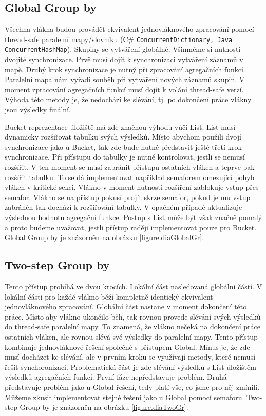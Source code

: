 \subsection{Global Group by} \label{anal.groupby.global}

Všechna vlákna budou provádět ekvivalent jednovláknového zpracování pomocí thread-safe paralelní mapy/slovníku (C\# \texttt{ConcurrentDictionary, Java \texttt{ConcurrentHashMap}}).
Skupiny se vytváření globálně.
Všimněme si nutnosti dvojité synchronizace.
Prvě musí dojít k synchronizaci vytváření záznamů v mapě.
Druhý krok synchronizace je nutný při zpracování agregačních funkcí.
Paralelní mapa nám vyřadí souběh při vytváření nových záznamů skupin.
V moment zpracování agregačních funkcí musí dojít k volání thread-safe verzí.
Výhoda této metody je, že nedochází ke slévání, tj. po dokončení práce vlákny jsou výsledky finální.

Bucket reprezentace úložiště má zde značnou výhodu vůči List.
List musí dynamicky rozšiřovat tabulku svých výsledků.
Místo abychom použili dvojí synchronizace jako u Bucket, tak zde bude nutné představit ještě třetí krok synchronizace.
Při přístupu do tabulky je nutné kontrolovat, jestli se nemusí rozšířit.
V ten moment se musí zabránit přístupu ostatních vláken a teprve pak rozšířit tabulku.
To se dá implementovat například semaforem omezující pohyb vláken v kritické sekci.
Vlákno v moment nutnosti rozšíření zablokuje vstup přes semafor.
Vlákno se na přístup pokusí projít skrze semafor, pokud je mu vstup zabráněn tak dochází k rozšiřování tabulky.
V opačném případě aktualizuje výslednou hodnotu agregační funkce.
Postup s List může být však značně pomalý a proto budeme uvažovat, jestli přístup raději implementovat pouze pro Bucket.
Global Group by je znázorněn na obrázku \ref{figure.diaGlobalGr}.

\subsection{Two-step Group by} \label{anal.groupby.twostep}

Tento přístup probíhá ve dvou krocích.
Lokální část nasledovaná globální částí. 
V lokální části pro každé vlákno běží kompletně identický ekvivalent jednovláknového zpracování.
Globální část nastane v moment dokončení této práce.
Místo aby vlákno ukončilo běh, tak rovnou provede slévání svých výsledků do thread-safe paralelní mapy.
To znamená, že vlákno nečeká na dokončení práce ostatních vláken, ale rovnou slévá své výsledky do paralelní mapy.
Tento přístup kombinuje jednovláknové řešení společně s přístupem Global.
Mínus je, že zde musí docházet ke slévání, ale v prvním kroku se využívají metody, které nemusí řešit synchoronizaci. 
Problematická část je zde slévání výsledků s List úložištěm výsledků agregačních funkcí.
První fáze nepředstavuje problém. 
Druhá představuje problém jako u Global řešení, tedy platí vše, co jsme pro něj zmínili.
Můžeme zkusit implementovat stejné řešení jako u Global pomocí semaforu.
Two-step Group by je znázorněn na obrázku \ref{figure.diaTwoGr}.

